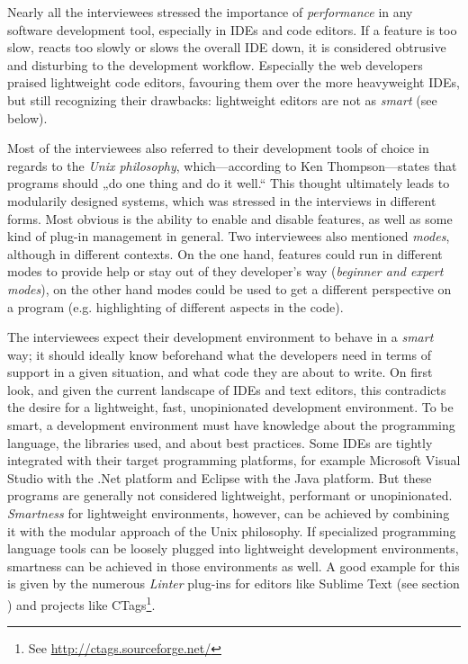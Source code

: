 Nearly all the interviewees stressed the importance of
\emph{performance} in any software development tool, especially in IDEs
and code editors. If a feature is too slow, reacts too slowly or slows
the overall IDE down, it is considered obtrusive and disturbing to the
development workflow. Especially the web developers praised lightweight
code editors, favouring them over the more heavyweight IDEs, but still
recognizing their drawbacks: lightweight editors are not as \emph{smart}
(see below).

Most of the interviewees also referred to their development tools of
choice in regards to the \emph{Unix philosophy}, which—according to Ken
Thompson—states that programs should „do one thing and do it well.“
\cite{raymond} This thought ultimately leads to modularily designed
systems, which was stressed in the interviews in different forms. Most
obvious is the ability to enable and disable features, as well as some
kind of plug-in management in general. Two interviewees also mentioned
\emph{modes}, although in different contexts. On the one hand, features
could run in different modes to provide help or stay out of they
developer’s way (\emph{beginner and expert modes}), on the other hand
modes could be used to get a different perspective on a program (e.g.
highlighting of different aspects in the code).

The interviewees expect their development environment to behave in a
\emph{smart} way; it should ideally know beforehand what the developers
need in terms of support in a given situation, and what code they are
about to write. On first look, and given the current landscape of IDEs
and text editors, this contradicts the desire for a lightweight, fast,
unopinionated development environment. To be smart, a development
environment must have knowledge about the programming language, the
libraries used, and about best practices. Some IDEs are tightly
integrated with their target programming platforms, for example
Microsoft Visual Studio with the .Net platform and Eclipse with the Java
platform. But these programs are generally not considered lightweight,
performant or unopinionated. \emph{Smartness} for lightweight
environments, however, can be achieved by combining it with the modular
approach of the Unix philosophy. If specialized programming language
tools can be loosely plugged into lightweight development environments,
smartness can be achieved in those environments as well. A good example
for this is given by the numerous \emph{Linter} plug-ins for editors
like Sublime Text (see section
) and projects like
CTags\footnote{See \url{http://ctags.sourceforge.net/}}.

